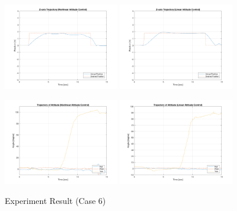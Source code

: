 \begin{figure}
    \includegraphics[width=0.45\textwidth]{graphics/experiment_plots/yaw_plus_non_position_z.png}
    \includegraphics[width=0.45\textwidth]{graphics/experiment_plots/yaw_plus_pid_position_z.png}

    \includegraphics[width=0.45\textwidth]{graphics/experiment_plots/yaw_plus_non_attitude.png}
    \includegraphics[width=0.45\textwidth]{graphics/experiment_plots/yaw_plus_pid_attitude.png}
    \caption{Experiment Result (Case 6)}
    \label{fig:exp_yaw_plus}
\end{figure}

